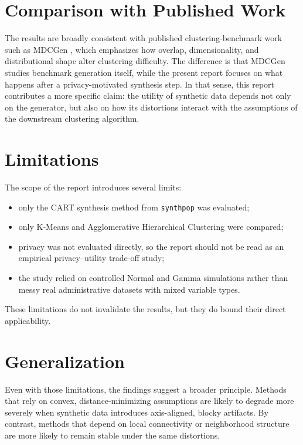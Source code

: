 \section{Comparison with Published Work}
\label{sec:comparison-published-work}

The results are broadly consistent with published clustering-benchmark work such as MDCGen \cite{iglesias2019}, which emphasizes how overlap, dimensionality, and distributional shape alter clustering difficulty. The difference is that MDCGen studies benchmark generation itself, while the present report focuses on what happens after a privacy-motivated synthesis step. In that sense, this report contributes a more specific claim: the utility of synthetic data depends not only on the generator, but also on how its distortions interact with the assumptions of the downstream clustering algorithm.

\section{Limitations}
\label{sec:limitations}

The scope of the report introduces several limits:
\begin{itemize}
  \item only the CART synthesis method from \texttt{synthpop} was evaluated;
  \item only K-Means and Agglomerative Hierarchical Clustering were compared;
  \item privacy was not evaluated directly, so the report should not be read as an empirical privacy--utility trade-off study;
  \item the study relied on controlled Normal and Gamma simulations rather than messy real administrative datasets with mixed variable types.
\end{itemize}

These limitations do not invalidate the results, but they do bound their direct applicability.

\section{Generalization}
\label{sec:generalization}

Even with those limitations, the findings suggest a broader principle. Methods that rely on convex, distance-minimizing assumptions are likely to degrade more severely when synthetic data introduces axis-aligned, blocky artifacts. By contrast, methods that depend on local connectivity or neighborhood structure are more likely to remain stable under the same distortions.

